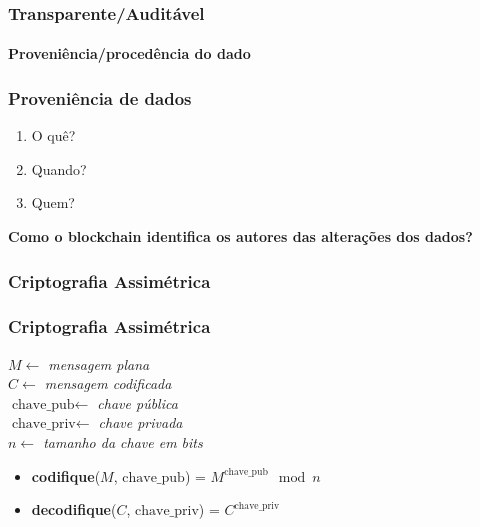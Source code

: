 \documentclass{beamer}
\begin{document}
\begin{frame}
    \frametitle{Transparente/Auditável}
    \framesubtitle{Proveniência/procedência do dado}
\end{frame}

\begin{frame}
    \frametitle{Proveniência de dados}
    \begin{enumerate}
        \item O quê?
        \item Quando?
        \item Quem?
    \end{enumerate}

\end{frame}

\begin{frame}
    \begin{center}
         \textbf{Como o blockchain identifica os autores das alterações dos dados?}
    \end{center}
\end{frame}



\begin{frame}
    \frametitle{Criptografia Assimétrica}
\end{frame}

\begin{frame}
\frametitle{Criptografia Assimétrica}
\begin{center}
\textit{
\( M \leftarrow \) mensagem plana \\
\( C \leftarrow \) mensagem codificada \\
\( \text{chave\_pub} \leftarrow \) chave pública \\
\( \text{chave\_priv} \leftarrow \) chave privada \\
\( n \leftarrow \) tamanho da chave em bits
}
\end{center}

\vspace{0.5cm}

\begin{itemize}
    \item \textbf{codifique}(\(M\), \(\text{chave\_pub}\)) = \(M^{\text{chave\_pub}} \mod n\)
    \item \textbf{decodifique}(\(C\), \(\text{chave\_priv}\)) = \(C^{\text{chave\_priv}}\)
\end{itemize}
\end{frame}
\end{document}
